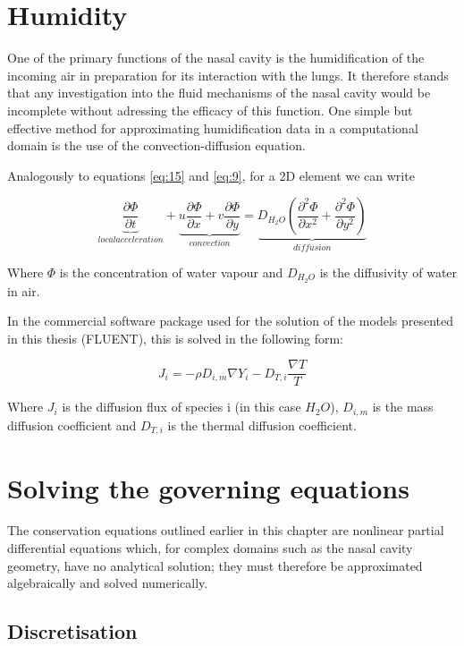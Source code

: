 \section{Humidity}

One of the primary functions of the nasal cavity is the humidification of the incoming air in preparation for its interaction with the lungs. It therefore stands that any investigation into the fluid mechanisms of the nasal cavity would be incomplete without adressing the efficacy of this function. One simple but effective method for approximating humidification data in a computational domain is the use of the convection-diffusion equation.

Analogously to equations \ref{eq:15} and \ref{eq:9}, for a 2D element we can write

\begin{equation} \label{eq:16}
  \underbrace{\frac{\partial \Phi}{\partial t}}_{local acceleration} + \underbrace{u \frac{\partial \Phi}{\partial x} + v \frac{\partial \Phi}{\partial y}}_{convection} = \underbrace{D_{H_{2} O} ( \frac{\partial^2 \Phi}{\partial x^2} + \frac{\partial^2 \Phi}{\partial y^2} )}_{diffusion}
\end{equation} \nocite{Naftali1998}

Where $\Phi$ is the concentration of water vapour and $D_{H_{2} O}$ is the diffusivity of water in air.

In the commercial software package used for the solution of the models presented in this thesis (FLUENT), this is solved in the following form:

\begin{equation} \label{eq:17}
 J_i = -\rho D_{i,m} \nabla Y_i - D_{T, i} \frac{\nabla T}{T}
\end{equation}

Where $J_i$ is the diffusion flux of species i (in this case $H_2 O$), $D_{i,m}$ is the mass diffusion coefficient and $D_{T,i}$ is the thermal diffusion coefficient.
\section{Solving the governing equations}

The conservation equations outlined earlier in this chapter are nonlinear partial differential equations which, for complex domains such as the nasal cavity geometry, have no analytical solution; they must therefore be approximated algebraically and solved numerically.

\subsection{Discretisation}

